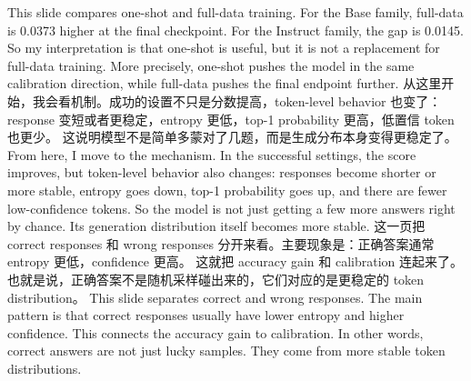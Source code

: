 {}\markdownRendererInterblockSeparator
{}This slide compares one-shot and full-data training. For the Base family, full-data is 0.0373 higher at the final checkpoint. For the Instruct family, the gap is 0.0145.\markdownRendererInterblockSeparator
{}So my interpretation is that one-shot is useful, but it is not a replacement for full-data training. More precisely, one-shot pushes the model in the same calibration direction, while full-data pushes the final endpoint further.\markdownRendererInterblockSeparator
{}\markdownRendererHorizontalRule{}\markdownRendererInterblockSeparator
{}\markdownRendererInterblockSeparator
{}\markdownRendererInterblockSeparator
{}从这里开始，我会看机制。成功的设置不只是分数提高，token-level behavior 也变了：response 变短或者更稳定，entropy 更低，top-1 probability 更高，低置信 token 也更少。\markdownRendererInterblockSeparator
{}这说明模型不是简单多蒙对了几题，而是生成分布本身变得更稳定了。\markdownRendererInterblockSeparator
{}\markdownRendererInterblockSeparator
{}From here, I move to the mechanism. In the successful settings, the score improves, but token-level behavior also changes: responses become shorter or more stable, entropy goes down, top-1 probability goes up, and there are fewer low-confidence tokens.\markdownRendererInterblockSeparator
{}So the model is not just getting a few more answers right by chance. Its generation distribution itself becomes more stable.\markdownRendererInterblockSeparator
{}\markdownRendererHorizontalRule{}\markdownRendererInterblockSeparator
{}\markdownRendererInterblockSeparator
{}\markdownRendererInterblockSeparator
{}这一页把 correct responses 和 wrong responses 分开来看。主要现象是：正确答案通常 entropy 更低，confidence 更高。\markdownRendererInterblockSeparator
{}这就把 accuracy gain 和 calibration 连起来了。也就是说，正确答案不是随机采样碰出来的，它们对应的是更稳定的 token distribution。\markdownRendererInterblockSeparator
{}\markdownRendererInterblockSeparator
{}This slide separates correct and wrong responses. The main pattern is that correct responses usually have lower entropy and higher confidence.\markdownRendererInterblockSeparator
{}This connects the accuracy gain to calibration. In other words, correct answers are not just lucky samples. They come from more stable token distributions.\markdownRendererInterblockSeparator
